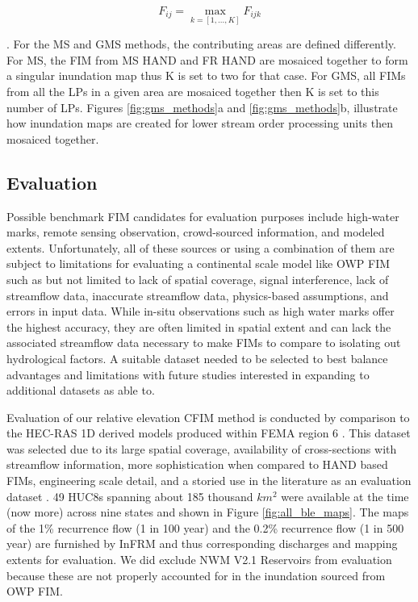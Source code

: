\documentclass[draft]{dependencies/agujournal2019}
\begin{document}
%
\begin{linenomath*}
\begin{equation}
\label{eq:comp_fim}
    F_{ij} = \max_{k=[1,...,K]} F_{ijk}
\end{equation}
\end{linenomath*}
. For the MS and GMS methods, the contributing areas are defined differently.
For MS, the FIM from MS HAND and FR HAND are mosaiced together to form a singular inundation map thus K is set to two for that case.
For GMS, all FIMs from all the LPs in a given area are mosaiced together then K is set to this number of LPs.
Figures \ref{fig:gms_methods}a and \ref{fig:gms_methods}b, illustrate how inundation maps are created for lower stream order processing units then mosaiced together.
%
\subsection{Evaluation}
\label{ssec:evaluation}
%
Possible benchmark FIM candidates for evaluation purposes include high-water marks, remote sensing observation, crowd-sourced information, and modeled extents.
Unfortunately, all of these sources or using a combination of them are subject to limitations for evaluating a continental scale model like OWP FIM such as but not limited to lack of spatial coverage, signal interference, lack of streamflow data, inaccurate streamflow data, physics-based assumptions, and errors in input data.
While in-situ observations such as high water marks offer the highest accuracy, they are often limited in spatial extent and can lack the associated streamflow data necessary to make FIMs to compare to isolating out hydrological factors.
A suitable dataset needed to be selected to best balance advantages and limitations with future studies interested in expanding to additional datasets as able to.

Evaluation of our relative elevation CFIM method is conducted by comparison to the HEC-RAS 1D derived models produced within FEMA region 6 \cite{fema2021base,fema2021estimated,us2022hydrologic}.
This dataset was selected due to its large spatial coverage, availability of cross-sections with streamflow information, more sophistication when compared to HAND based FIMs, engineering scale detail, and a storied use in the literature as an evaluation dataset \cite{cook2009effect,rajib2016large,zheng2018geoflood,afshari2018comparison,wing2017validation,criss2022stage,follum2017autorapid}.
49 HUC8s spanning about 185 thousand $km^2$ were available at the time (now more) across nine states and shown in Figure \ref{fig:all_ble_maps}.
The maps of the 1\% recurrence flow (1 in 100 year) and the 0.2\% recurrence flow (1 in 500 year) are furnished by InFRM and thus corresponding discharges and mapping extents for evaluation.
We did exclude NWM V2.1 Reservoirs from evaluation because these are not properly accounted for in the inundation sourced from OWP FIM.
\end{document}

